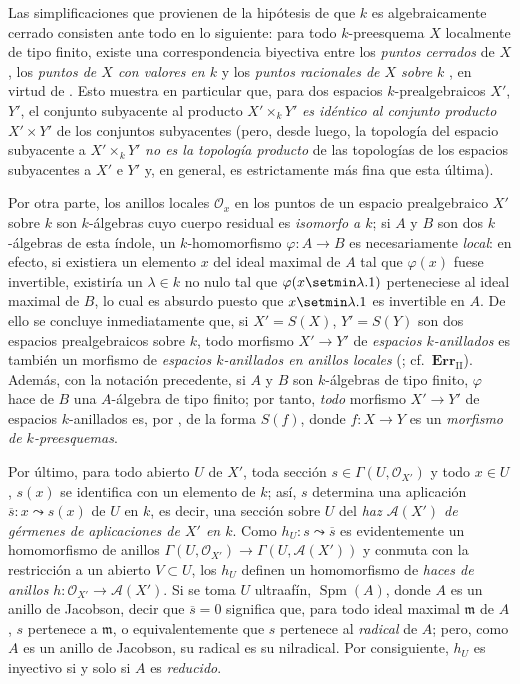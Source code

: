 \begin{env}[10.10.3]
\label{IV.10.10.3}
Las simplificaciones que provienen de la hipótesis de que $k$ es algebraicamente cerrado consisten ante todo en lo siguiente: para todo $k$-preesquema $X$ localmente de tipo finito, existe una correspondencia biyectiva entre los \emph{puntos cerrados} de $X$, los \emph{puntos de $X$ con valores en $k$}  y los \emph{puntos racionales de $X$ sobre $k$} , en virtud de .
Esto muestra en particular  que, para dos espacios $k$-prealgebraicos $X'$, $Y'$, el conjunto subyacente al producto $X'\times_kY'$ \emph{es idéntico al conjunto producto} $X'\times Y'$ de los conjuntos subyacentes (pero, desde luego, la topología del espacio subyacente a $X'\times_kY'$ \emph{no es la topología producto} de las topologías de los espacios subyacentes a $X'$ e $Y'$ y, en general, es estrictamente más fina que esta última).

Por otra parte, los anillos locales $\mathcal O_x$ en los puntos de un espacio prealgebraico $X'$ sobre $k$ son $k$-álgebras cuyo cuerpo residual es \emph{isomorfo a $k$}; si $A$ y $B$ son dos $k$-álgebras de esta índole, un $k$-homomorfismo $\varphi:A\to B$ es necesariamente \emph{local}: en efecto, si existiera un elemento $x$ del ideal maximal de $A$ tal que $\varphi(x)$ fuese invertible, existiría un $\lambda\in k$ no nulo tal que $\varphi(x\setmin\lambda.1)$ perteneciese al ideal maximal de $B$, lo cual es absurdo puesto que $x\setmin\lambda.1$ es invertible en $A$.
De ello se concluye inmediatamente que, si $X'=S(X)$, $Y'=S(Y)$ son dos espacios prealgebraicos sobre $k$, todo morfismo $X'\to Y'$ de \emph{espacios $k$-anillados} es también un morfismo de \emph{espacios $k$-anillados en anillos locales} (; cf.\ $\mathbf{Err}_{\mathrm{II}}$). Además, con la notación precedente, si $A$ y $B$ son $k$-álgebras de tipo finito, $\varphi$ hace de $B$ una $A$-álgebra de tipo finito; por tanto, \emph{todo} morfismo $X'\to Y'$ de espacios $k$-anillados es, por , de la forma $S(f)$, donde $f:X\to Y$ es un \emph{morfismo de $k$-preesquemas}.

Por último, para todo abierto $U$ de $X'$, toda sección $s\in\Gamma(U,\mathcal O_{X'})$ y todo $x\in U$, $s(x)$  se identifica con un elemento de $k$; así, $s$ determina una aplicación $\overline s:x\leadsto s(x)$ de $U$ en $k$, es decir, una sección sobre $U$ del \emph{haz $\mathcal A(X')$ de gérmenes de aplicaciones de $X'$ en $k$}. Como $h_U:s\leadsto\overline s$ es evidentemente un homomorfismo de anillos $\Gamma(U,\mathcal O_{X'})\to\Gamma(U,\mathcal A(X'))$ y conmuta con la restricción a un abierto $V\subset U$, los $h_U$ definen un homomorfismo de \emph{haces de anillos} $h:\mathcal O_{X'}\to\mathcal A(X')$.
Si se toma $U$ ultraafín, $\operatorname{Spm}(A)$, donde $A$ es un anillo de Jacobson, decir que $\overline s=0$ significa que, para todo ideal maximal $\mathfrak m$ de $A$, $s$ pertenece a $\mathfrak m$, o equivalentemente que $s$ pertenece al \emph{radical} de $A$; pero, como $A$ es un anillo de Jacobson, su radical es su nilradical. Por consiguiente, $h_U$ es inyectivo si y solo si $A$ es \emph{reducido}.
\end{env}

